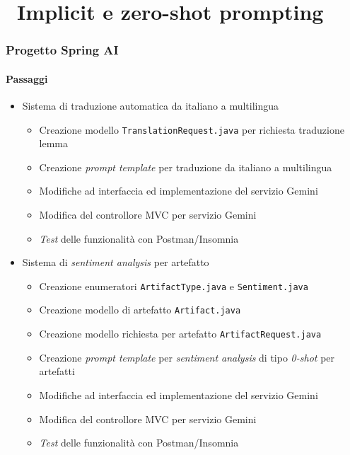 \section{\faWrench\ Implicit e zero-shot prompting} %
\label{sec:spring-ai-gemini-implicit-zero-shot-prompting}
%
\begin{frame}[t,fragile] \frametitle{Progetto Spring AI}
    \framesubtitle{Passaggi}
    {\small
        \begin{itemize}[leftmargin=10pt,align=right]
            \item[\alert{\faArrowCircleRight}] Sistema di \alert{traduzione automatica} da italiano a multilingua
            \begin{itemize}[leftmargin=10pt,align=right]
                \item[\alertedcircled{1}] Creazione modello \texttt{TranslationRequest.java} per richiesta traduzione lemma
                \item[\alertedcircled{2}] Creazione \textit{prompt template} per traduzione da italiano a multilingua 
                \item[\alertedcircled{3}] Modifiche ad interfaccia ed implementazione del servizio Gemini
                \item[\alertedcircled{4}] Modifica del controllore MVC per servizio Gemini
                \item[\alertedcircled{5}] \textit{Test} delle funzionalità con Postman/Insomnia           
            \end{itemize}
            \item[\alert{\faArrowCircleRight}] Sistema di \alert{\textit{sentiment analysis}} per artefatto
            \begin{itemize}[leftmargin=10pt,align=right]
                \item[\alertedcircled{1}] Creazione enumeratori \texttt{ArtifactType.java} e \texttt{Sentiment.java}
                \item[\alertedcircled{2}] Creazione modello di artefatto \texttt{Artifact.java}
                \item[\alertedcircled{3}] Creazione modello richiesta per artefatto \texttt{ArtifactRequest.java}
                \item[\alertedcircled{4}] Creazione \textit{prompt template} per \textit{sentiment analysis} di tipo \textit{0-shot} per artefatti
                \item[\alertedcircled{5}] Modifiche ad interfaccia ed implementazione del servizio Gemini
                \item[\alertedcircled{6}] Modifica del controllore MVC per servizio Gemini
                \item[\alertedcircled{7}] \textit{Test} delle funzionalità con Postman/Insomnia
            \end{itemize}
        \end{itemize}
    }
\end{frame}
